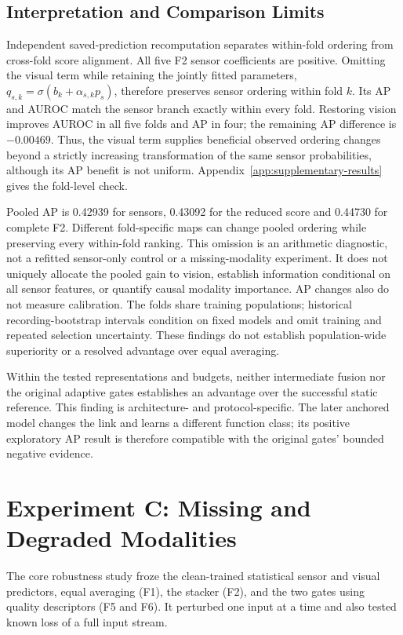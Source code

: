 \subsection{Interpretation and Comparison Limits}
Independent saved-prediction recomputation separates within-fold ordering from
cross-fold score alignment. All five F2 sensor coefficients are positive. Omitting the
visual term while retaining the jointly fitted parameters,
$q_{s,k}=\sigma(b_k+\alpha_{s,k}p_s)$, therefore preserves sensor ordering within fold
$k$. Its AP and AUROC match the sensor branch exactly within every fold. Restoring
vision improves AUROC in all five folds and AP in four; the remaining AP difference is
$-0.00469$. Thus, the visual term supplies beneficial observed ordering changes beyond a
strictly increasing transformation of the same sensor probabilities, although its AP
benefit is not uniform. Appendix~\ref{app:supplementary-results} gives the fold-level
check.

Pooled AP is 0.42939 for sensors, 0.43092 for the reduced score and 0.44730 for complete
F2. Different fold-specific maps can change pooled ordering while preserving every
within-fold ranking. This omission is an arithmetic diagnostic, not a refitted
sensor-only control or a missing-modality experiment. It does not uniquely allocate the
pooled gain to vision, establish information conditional on all sensor features, or
quantify causal modality importance. AP changes also do not measure calibration. The
folds share training populations; historical recording-bootstrap intervals condition on
fixed models and omit training and repeated selection uncertainty. These findings do not
establish population-wide superiority or a resolved advantage over equal
averaging.

Within the tested representations and budgets, neither intermediate fusion nor the
original adaptive gates establishes an advantage over the successful static reference.
This finding is architecture- and protocol-specific. The later anchored model changes
the link and learns a different function class; its positive exploratory AP result is
therefore compatible with the original gates' bounded negative evidence.

\section{Experiment C: Missing and Degraded Modalities}
The core robustness study froze the clean-trained statistical sensor and visual
predictors, equal averaging (F1), the stacker (F2), and the two gates using
quality descriptors (F5 and F6). It perturbed one input at a time and also tested known
loss of a full input stream.

